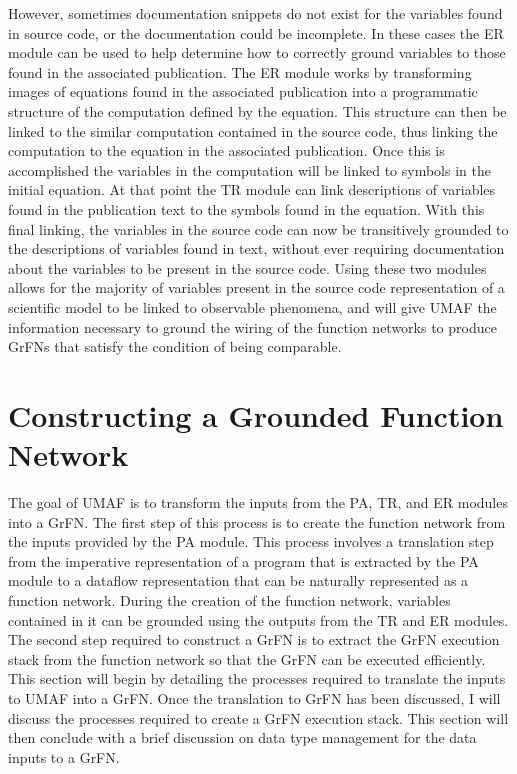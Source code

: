 However, sometimes documentation snippets do not exist for the variables found in source code, or the documentation could be incomplete.
In these cases the ER module can be used to help determine how to correctly ground variables to those found in the associated publication.
The ER module works by transforming images of equations found in the associated publication into a programmatic structure of the computation defined by the equation.
This structure can then be linked to the similar computation contained in the source code, thus linking the computation to the equation in the associated publication.
Once this is accomplished the variables in the computation will be linked to symbols in the initial equation.
At that point the TR module can link descriptions of variables found in the publication text to the symbols found in the equation.
With this final linking, the variables in the source code can now be transitively grounded to the descriptions of variables found in text, without ever requiring documentation about the variables to be present in the source code.
Using these two modules allows for the majority of variables present in the source code representation of a scientific model to be linked to observable phenomena, and will give UMAF the information necessary to ground the wiring of the function networks to produce GrFNs that satisfy the condition of being comparable.

\section{Constructing a Grounded Function Network \label{sec:grfn_assembly}}
The goal of UMAF is to transform the inputs from the PA, TR, and ER modules into a GrFN.
The first step of this process is to create the function network from the inputs provided by the PA module.
This process involves a translation step from the imperative representation of a program that is extracted by the PA module to a dataflow representation that can be naturally represented as a function network.
During the creation of the function network, variables contained in it can be grounded using the outputs from the TR and ER modules.
The second step required to construct a GrFN is to extract the GrFN execution stack from the function network so that the GrFN can be executed efficiently.
This section will begin by detailing the processes required to translate the inputs to UMAF into a GrFN.
Once the translation to GrFN has been discussed, I will discuss the processes required to create a GrFN execution stack.
This section will then conclude with a brief discussion on data type management for the data inputs to a GrFN.

